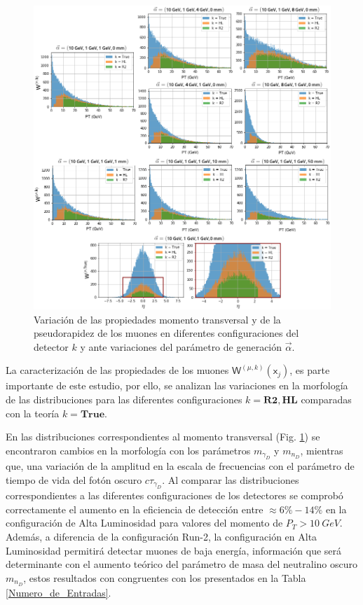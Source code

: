 \begin{figure}[!t]
\centering
\includegraphics[width=.9\textwidth]{Cap4/imagenes/PT_comparacion.png}
\caption{Variación de las propiedades momento transversal y de la pseudorapidez de los muones en diferentes configuraciones del detector $k$ y ante variaciones del parámetro de generación $\vec{\alpha}$.}
\label{Comparacion}
\end{figure}

La caracterización de las propiedades de los muones $ \textsf{W}^{(\mu,k)} ({\textsf{x}_j})$, es parte importante de este estudio, por ello, se analizan las variaciones en la morfología de las distribuciones para las diferentes configuraciones $k=\mathbf{R2}, \mathbf{HL}$ comparadas con la teoría $k=\mathbf{True}$. 

En las distribuciones correspondientes al momento transversal (Fig. \ref{Comparacion}) se encontraron cambios en la morfología con los parámetros $m_{\gamma_D}$ y $m_{n_D}$, mientras que, una variación de la amplitud  en la escala de frecuencias con el parámetro de tiempo de vida del fotón oscuro $c\tau_{\gamma_D}$. Al comparar las distribuciones correspondientes a las diferentes configuraciones de los detectores se comprobó correctamente el aumento en la eficiencia de detección entre $\approx 6\%-14\%$ en la configuración de Alta Luminosidad para valores del momento de $P_T>10 ~GeV$. Además, a diferencia de la configuración Run-2, la configuración en Alta Luminosidad permitirá detectar muones de baja energía, información que será determinante con el aumento teórico del parámetro de masa del neutralino oscuro $m_{n_D}$, estos resultados con congruentes con los presentados en la Tabla \ref{Numero_de_Entradas}.

